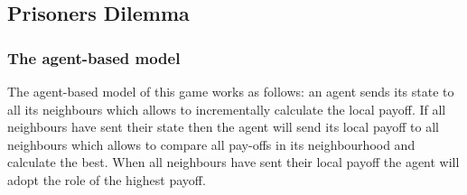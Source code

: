
\subsection{Prisoners Dilemma}
\subsubsection{The agent-based model}
The agent-based model of this game works as follows: an agent sends its state to all its neighbours which allows to incrementally calculate the local payoff. If all neighbours have sent their state then the agent will send its local payoff to all neighbours which allows to compare all pay-offs in its neighbourhood and calculate the best. When all neighbours have sent their local payoff the agent will adopt the role of the highest payoff.

